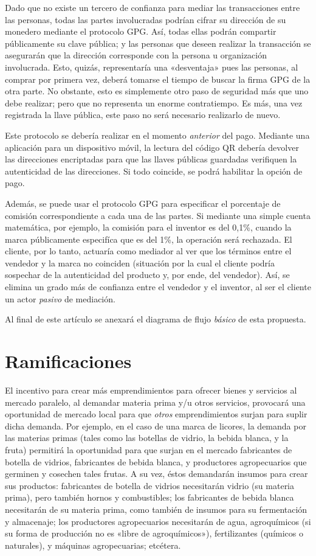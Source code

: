 \documentclass[12pt,a4paper]{article}
\begin{document}
Dado que no existe un tercero de confianza para mediar las transacciones entre las personas, todas las partes involucradas podrían cifrar su dirección de su monedero mediante el protocolo GPG. Así, todas ellas podrán compartir públicamente su clave pública; y las personas que deseen realizar la transacción se asegurarán que la dirección corresponde con la persona u organización involucrada. Esto, quizás, representaría una «desventaja» pues las personas, al comprar por primera vez, deberá tomarse el tiempo de buscar la firma GPG de la otra parte. No obstante, esto es simplemente otro paso de seguridad más que uno debe realizar; pero que no representa un enorme contratiempo. Es más, una vez registrada la llave pública, este paso no será necesario realizarlo de nuevo.

Este protocolo se debería realizar en el momento \textit{anterior} del pago. Mediante una aplicación para un dispositivo móvil, la lectura del código QR debería devolver las direcciones encriptadas para que las llaves públicas guardadas verifiquen la autenticidad de las direcciones. Si todo coincide, se podrá habilitar la opción de pago.

Además, se puede usar el protocolo GPG para especificar el porcentaje de comisión correspondiente a cada una de las partes. Si mediante una simple cuenta matemática, por ejemplo, la comisión para el inventor es del 0,1\%, cuando la marca públicamente especifíca que es del 1\%, la operación será rechazada. El cliente, por lo tanto, actuaría como mediador al ver que los términos entre el vendedor y la marca no coinciden (situación por la cual el cliente podría sospechar de la autenticidad del producto y, por ende, del vendedor). Así, se elimina un grado más de confianza entre el vendedor y el inventor, al ser el cliente un actor \textit{pasivo} de mediación.

Al final de este artículo se anexará el diagrama de flujo \textit{básico} de esta propuesta.

\section{Ramificaciones}
El incentivo para crear más emprendimientos para ofrecer bienes y servicios al mercado paralelo, al demandar materia prima y/u otros servicios, provocará una oportunidad de mercado local para que \textit{otros} emprendimientos surjan para suplir dicha demanda. Por ejemplo, en el caso de una marca de licores, la demanda por las materias primas (tales como las botellas de vidrio, la bebida blanca, y la fruta) permitirá la oportunidad para que surjan en el mercado fabricantes de botella de vidrios, fabricantes de bebida blanca, y productores agropecuarios que germinen y cosechen tales frutas. A su vez, éstos demandarán insumos para crear sus productos: fabricantes de botella de vidrios necesitarán vidrio (su materia prima), pero también hornos y combustibles; los fabricantes de bebida blanca necesitarán de su materia prima, como también de insumos para su fermentación y almacenaje; los productores agropecuarios necesitarán de agua, agroquímicos (si su forma de producción no es «libre de agroquímicos»), fertilizantes (químicos o naturales), y máquinas agropecuarias; etcétera.
\end{document}
